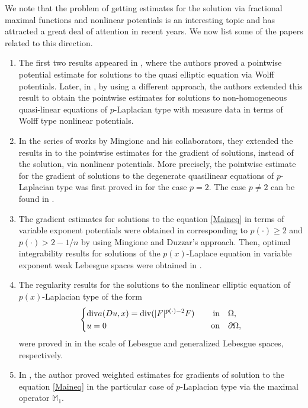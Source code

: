\documentclass[a4paper,10pt]{amsart}
\newcommand{\pd}{p(\cdot)}
\newcommand{\px}{p(x)}
\newcommand{\Om}{\Omega}
\newcommand{\di}{{\rm div}}
\begin{document}
We note that the problem of getting estimates for the solution via fractional maximal functions and  nonlinear potentials is an interesting topic and has attracted a great deal of attention in recent years. We now list some of the papers related to this direction.\\
\begin{enumerate}[{\rm (i)}]
	\item The first two results appeared in \cite{KM1, KM2}, where the authors proved a pointwise potential estimate for solutions to the quasi elliptic equation via Wolff potentials. Later, in \cite{TW}, by using a different approach, the authors extended this result to obtain the pointwise estimates for solutions
	to non-homogeneous quasi-linear equations of $p$-Laplacian type with measure data in terms of Wolff type nonlinear potentials.\\
	
	
\item In the series of works by Mingione and his collaborators, they extended the results in \cite{TW} to the pointwise estimates for the gradient of solutions, instead of the solution, via nonlinear potentials. More precisely, the pointwise estimate for the gradient of solutions to the degenerate quasilinear equations of $p$-Laplacian type was first proved in \cite{M1} for the case $p=2$. The case $p\neq 2$ can be found in \cite{DM1, DM2, DM3, KMi1, KMi2}.\\

\item The gradient estimates for solutions to the equation \eqref{Maineq} in terms of variable exponent potentials were obtained in \cite{BH, BaH} corresponding to $p(\cdot)\geq 2$ and $p(\cdot)>2-1/n$ by using Mingione and Duzzar's approach. Then, optimal integrability results for solutions of the $\px$-Laplace equation in variable exponent weak Lebesgue spaces were obtained in \cite{AHHL}.\\


\item The regularity results for the solutions to the nonlinear elliptic equation of $p(x)$-Laplacian type of the form
\[
\left\{
\begin{aligned}
&\di a(Du, x)=\di(|F|^{\pd -2}F) \quad &\text{in}& \quad \Om,\\
&u=0  \quad &\text{on}& \quad \partial\Om,
\end{aligned}
\right.
\]
 were proved in \cite{BOR, BO} in the scale of Lebesgue and generalized Lebesgue spaces, respectively.\\
 
 \item In \cite{Ph}, the author proved weighted estimates for gradients of solution to the equation \eqref{Maineq} in the particular case of $p$-Laplacian type via the maximal operator $\mathbb{M}_1$.\\
 
  
\end{enumerate}
\end{document}
